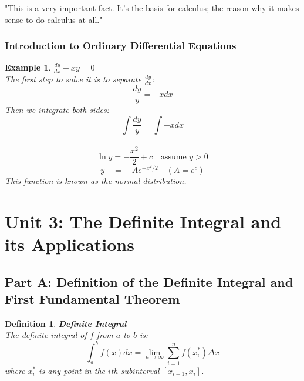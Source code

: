 \documentclass[10pt, a4paper]{article}
\newtheorem{definition}{Definition}
\newtheorem{example}{Example}
\begin{document}
"This is a very important fact. It's the basis for calculus; the reason why it makes sense to do calculus at all."

\subsubsection*{Introduction to Ordinary Differential Equations}
\begin{example}
    \textbf{$\frac{dy}{dx} + xy  = 0$} \\
    The first step to solve it is to separate $\frac{dy}{dx}$:
    \[\frac{dy}{y} = -xdx\]
    Then we integrate both sides:
    \[\int\frac{dy}{y} = \int-xdx\]\
    \[\ln y = -\frac{x^2}{2} + c \quad\text{assume } y > 0\]
    \[ y\quad=\quad Ae^{-x^2/2}\quad(A=e^c) \]
    This function is known as the normal distribution.
\end{example}

\section*{Unit 3: The Definite Integral and its Applications}
\subsection*{Part A: Definition of the Definite Integral and First Fundamental Theorem}
\begin{definition}
    \textbf{Definite Integral} \\
    The definite integral of $f$ from $a$ to $b$ is:
    \[\int_a^bf(x)dx = \lim_{n\to\infty}\sum_{i=1}^nf(x_i^*)\Delta x\]
    where $x_i^*$ is any point in the $i$th subinterval $[x_{i-1}, x_i]$.
\end{definition}
\end{document}
